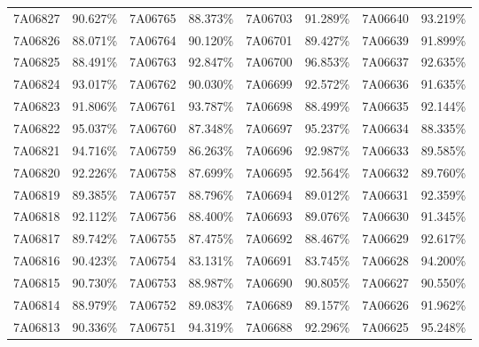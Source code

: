 \documentclass[12pt]{article}%
\begin{document}
\begin{longtable}{|cc|cc|cc|cc|}
7A06827              & 90.627\% & 7A06765              & 88.373\% & 7A06703              & 91.289\% & 7A06640              & 93.219\% \\
7A06826              & 88.071\% & 7A06764              & 90.120\% & 7A06701              & 89.427\% & 7A06639              & 91.899\% \\
7A06825              & 88.491\% & 7A06763              & 92.847\% & 7A06700              & 96.853\% & 7A06637              & 92.635\% \\
7A06824              & 93.017\% & 7A06762              & 90.030\% & 7A06699              & 92.572\% & 7A06636              & 91.635\% \\
7A06823              & 91.806\% & 7A06761              & 93.787\% & 7A06698              & 88.499\% & 7A06635              & 92.144\% \\
7A06822              & 95.037\% & 7A06760              & 87.348\% & 7A06697              & 95.237\% & 7A06634              & 88.335\% \\
7A06821              & 94.716\% & 7A06759              & 86.263\% & 7A06696              & 92.987\% & 7A06633              & 89.585\% \\
7A06820              & 92.226\% & 7A06758              & 87.699\% & 7A06695              & 92.564\% & 7A06632              & 89.760\% \\
7A06819              & 89.385\% & 7A06757              & 88.796\% & 7A06694              & 89.012\% & 7A06631              & 92.359\% \\
7A06818              & 92.112\% & 7A06756              & 88.400\% & 7A06693              & 89.076\% & 7A06630              & 91.345\% \\
7A06817              & 89.742\% & 7A06755              & 87.475\% & 7A06692              & 88.467\% & 7A06629              & 92.617\% \\
7A06816              & 90.423\% & 7A06754              & 83.131\% & 7A06691              & 83.745\% & 7A06628              & 94.200\% \\
7A06815              & 90.730\% & 7A06753              & 88.987\% & 7A06690              & 90.805\% & 7A06627              & 90.550\% \\
7A06814              & 88.979\% & 7A06752              & 89.083\% & 7A06689              & 89.157\% & 7A06626              & 91.962\% \\
7A06813              & 90.336\% & 7A06751              & 94.319\% & 7A06688              & 92.296\% & 7A06625              & 95.248\% \\

\end{longtable}
\end{document}
